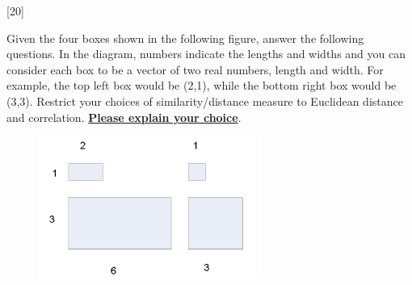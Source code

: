 \documentclass[12pt,letterpaper, onecolumn]{exam}
\begin{document}
\begin{questions}
    \pagebreak

    [20]

    Given the four boxes shown in the following figure, answer the following questions. In the 
    diagram, numbers indicate the lengths and widths and you can consider each box to be a vector 
    of two real numbers, length and width. For example, the top left box would be (2,1), while the 
    bottom right box would be (3,3). Restrict your choices of similarity/distance measure to 
    Euclidean distance and correlation. \textbf{\underline{Please explain your choice}}.

    \begin{figure}[h]
        \centering
        \includegraphics[width=0.65\textwidth]{boxes.png}
    \end{figure}



\end{questions}
\end{document}
